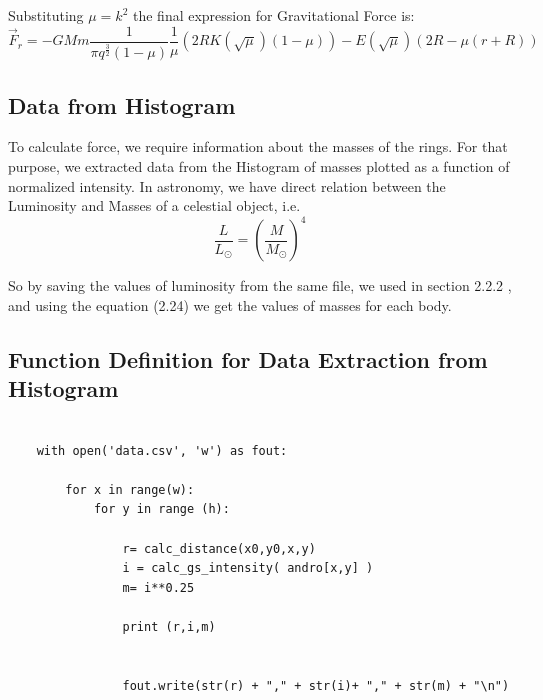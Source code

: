 Substituting $\mu = k^2$ the final expression for Gravitational Force is:
\begin{equation}
   \vec{F}_{r} = - GMm \frac{1}{\pi q^ \frac{3}{2} (1- \mu)} \frac{1}{\mu} (2 R K(\sqrt{\mu}) (1 - \mu))- E (\sqrt{\mu}) (2 R - \mu (r + R))
\end{equation}

\subsection{Data from Histogram}
To calculate force, we require information about the masses of the rings. For that purpose, we extracted data from the Histogram of masses plotted as a function of normalized intensity. In astronomy, we have direct relation between the Luminosity and Masses of a celestial object, i.e. 
%
\begin{equation}
   \frac{L}{L_{\odot}} = (\frac{M}{M_{\odot}})^4 
\end{equation}

So by saving the values of luminosity from the same file, we used in section 2.2.2 , and using the equation (2.24) we get the values of masses for each body.  

\subsection{Function Definition for Data Extraction from Histogram}
\begin{verbatim}

    with open('data.csv', 'w') as fout:

        for x in range(w):
            for y in range (h):

                r= calc_distance(x0,y0,x,y)
                i = calc_gs_intensity( andro[x,y] )
                m= i**0.25 

                print (r,i,m)


                fout.write(str(r) + "," + str(i)+ "," + str(m) + "\n")

\end{verbatim}


